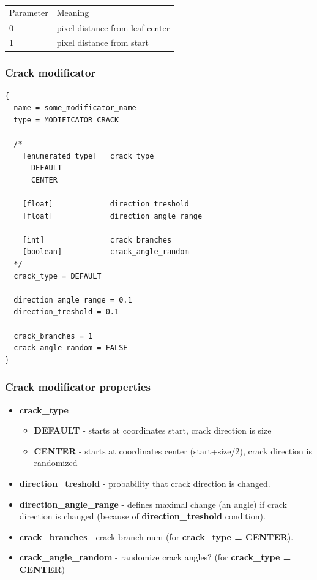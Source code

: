 \documentclass[9pt]{article}
\begin{document}
\begin{tabular}{|l||l|}
  Parameter & Meaning \\
  0 & pixel distance from leaf center \\
  1 & pixel distance from start \\  
\end{tabular}

\subsubsection{Crack modificator}

\begin{verbatim}
{
  name = some_modificator_name
  type = MODIFICATOR_CRACK

  /*
    [enumerated type]   crack_type    
      DEFAULT
      CENTER
      
    [float]             direction_treshold
    [float]             direction_angle_range
    
    [int]               crack_branches
    [boolean]           crack_angle_random
  */
  crack_type = DEFAULT
  
  direction_angle_range = 0.1
  direction_treshold = 0.1
  
  crack_branches = 1
  crack_angle_random = FALSE
}
\end{verbatim}
\subsubsection*{Crack modificator properties}
\begin{itemize}
\item{\bf crack\_type}
\begin{itemize}
\item{\bf DEFAULT} - starts at coordinates start, crack direction is size
\item{\bf CENTER} - starts at coordinates center (start+size/2), 
crack direction is randomized
\end{itemize}
\item{\bf direction\_treshold} - probability that crack direction is changed.
\item{\bf direction\_angle\_range} - defines maximal change (an angle)
if crack direction is changed (because of {\bf direction\_treshold} condition).
\item{\bf crack\_branches} - crack branch num (for {\bf crack\_type = CENTER}).
\item{\bf crack\_angle\_random} - randomize crack angles? (for {\bf crack\_type = CENTER})
\end{itemize}
\end{document}
